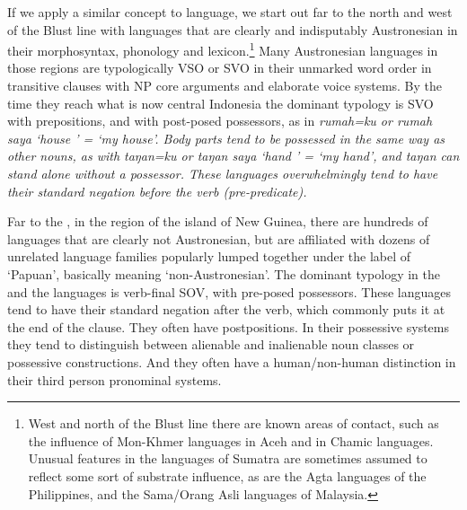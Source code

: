 If we apply a similar concept to language,
we start out far to the north
and west of the Blust line with languages that are clearly
and indisputably Austronesian in their morphosyntax,
phonology and lexicon.\footnote{
West and north of the Blust line
there are known areas of contact,
such as the influence of Mon-Khmer languages in Aceh
and in Chamic languages.
Unusual features in the  languages of Sumatra are sometimes
assumed to reflect some sort of substrate influence,
as are the Agta languages of the Philippines,
and the Sama/Orang Asli languages of Malaysia.}
Many Austronesian
languages in those regions are typologically VSO or SVO in their
unmarked word order in transitive clauses with NP core arguments
and elaborate voice systems.
By the time they reach what is now central Indonesia the dominant
typology is SVO with prepositions,
and with post-posed possessors,
as in  \it{rumah=ku} or \it{rumah saya} ‘house ’ = ‘my house’.
Body parts tend to be possessed in the same way as other nouns,
as with  \it{taŋan=ku} or \it{taŋan saya} ‘hand ’
= ‘my hand’, and \it{taŋan} can stand alone without a possessor.
These languages overwhelmingly tend to have their standard negation
before the verb (pre-predicate).

Far to the ,
in the region of the island of New Guinea,
there are hundreds of languages that are clearly not Austronesian,
but are affiliated with dozens of unrelated language families
popularly lumped together under the label of ‘Papuan’, basically meaning ‘non-Austronesian’.
The dominant typology in the 
and the  languages is verb-final SOV, with pre-posed possessors.
These languages tend to have their standard negation after the
verb, which commonly puts it at the end of the clause.
They often have postpositions.
In their possessive systems they tend to distinguish between
alienable and inalienable noun classes or possessive constructions.
And they often have a human/non-human distinction in their third person pronominal systems.

